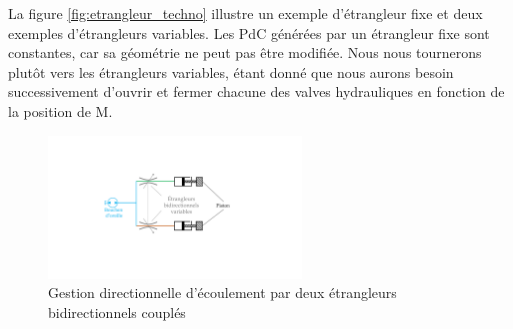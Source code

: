 La figure \ref{fig:etrangleur_techno} illustre un exemple d'étrangleur fixe et deux exemples d'étrangleurs variables.
Les PdC générées par un étrangleur fixe sont constantes, car sa géométrie ne peut pas être modifiée. Nous nous tournerons plutôt vers les étrangleurs variables, étant donné que nous aurons besoin successivement d'ouvrir et fermer chacune des valves hydrauliques en fonction de la position de M.
\begin{figure}[!htbp]
	\begin{center}
		\captionsetup{justification=centering}
		\includegraphics[trim={7cm 6.2cm 9.5cm 5cm},clip,width=0.6\textwidth]{../Chap2/Figure/etrangleur_hyd.pdf}
		\caption{Gestion directionnelle d'écoulement par deux étrangleurs bidirectionnels couplés}
		\label{fig:etrangleur_hyd}
	\end{center}
\end{figure}
